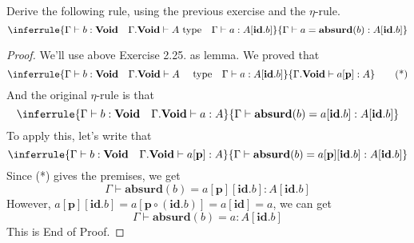 \documentclass[12pt, a4paper, openany, twoside]{book}
\theoremstyle{definition}
\theoremstyle{remark}
\theoremstyle{plain}
\numberwithin{equation}{section}
\begin{document}
\begin{tcolorbox}[breakable, colback=yellow!10!white,colframe=brown!75!black,title=Exercise 3.2.8.]\hypertarget{const 3.2.8.}{}
Derive the following rule, using the previous exercise and the $\eta$-rule. 
\[
\inferrule
{
    \Gamma \vdash b : \mathbf{Void} \quad \Gamma.\mathbf{Void} \vdash A \text{ type} \quad \Gamma \vdash a : A[\mathbf{id}.b]
}
{
    \Gamma \vdash a = \mathbf{absurd}(b) : A[\mathbf{id}.b]
}
\]

\begin{proof}

We'll use above Exercise 2.25. as lemma. We proved that 
\[
\inferrule
{
    \Gamma \vdash b : \mathbf{Void} \quad  \Gamma.\mathbf{Void} \vdash A \quad \text{ type} \quad \Gamma \vdash a : A[\mathbf{id}.b]
}
{
    \Gamma.\mathbf{Void} \vdash a[\mathbf{p}] : A
}
\tag{*}
\]
And the original $\eta$-rule is that 
\[
\inferrule
{
    \Gamma \vdash b : \mathbf{Void} \quad \Gamma.\mathbf{Void} \vdash a : A 
}
{
    \Gamma \vdash \mathbf{absurd}(b) = a[\mathbf{id}.b] : A[\mathbf{id}.b]
}
\]
To apply this, let's write that 
\[
\inferrule
{
    \Gamma \vdash b : \mathbf{Void} \quad \Gamma.\mathbf{Void} \vdash a[\mathbf{p}] : A 
}
{
    \Gamma \vdash \mathbf{absurd}(b) = a[\mathbf{p}][\mathbf{id}.b] : A[\mathbf{id}.b]
}
\]
Since (*) gives the premises, we get 
\[\Gamma \vdash \mathbf{absurd}(b) = a[\mathbf{p}][\mathbf{id}.b] : A[\mathbf{id}.b]\]
However, $a[\mathbf{p}][\mathbf{id}.b] = a[\mathbf{p}\circ (\mathbf{id}.b)] = a[\mathbf{id}] = a$, we can get 
\[\Gamma \vdash  \mathbf{absurd}(b) = a : A[\mathbf{id}.b]\]
This is End of Proof. 
\end{proof}
\end{tcolorbox}
\end{document}
